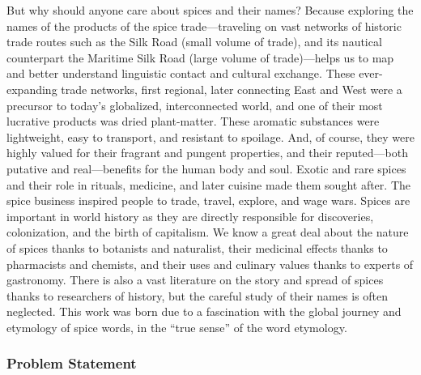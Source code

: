 But why should anyone care about spices and their names? Because exploring the names of the products of the spice trade---traveling on vast networks of historic trade routes such as the Silk Road (small volume of trade), and its nautical counterpart the Maritime Silk Road (large volume of trade)---helps us to map and better understand linguistic contact and cultural exchange. These ever-expanding trade networks, first regional, later connecting East and West were a precursor to today's globalized, interconnected world, and one of their most lucrative products was dried plant-matter. These aromatic substances were lightweight, easy to transport, and resistant to spoilage. And, of course, they were highly valued for their fragrant and pungent properties, and their reputed---both putative and real---benefits for the human body and soul. Exotic and rare spices and their role in rituals, medicine, and later cuisine made them sought after. The spice business inspired people to trade, travel, explore, and wage wars. Spices are important in world history as they are directly responsible for discoveries, colonization, and the birth of capitalism. We know a great deal about the nature of spices thanks to botanists and naturalist, their medicinal effects thanks to pharmacists and chemists, and their uses and culinary values thanks to experts of gastronomy. There is also a vast literature on the story and spread of spices thanks to researchers of history, but the careful study of their names is often neglected. This work was born due to a fascination with the global journey and etymology of spice words, in the ``true sense'' of the word etymology. 

\subsubsection{Problem Statement}

